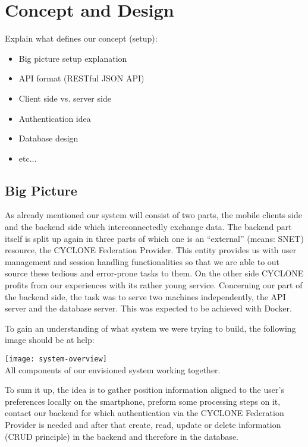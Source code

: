 \chapter{Concept and Design}
\label{cha:conceptanddesign}

Explain what defines our concept (setup):
\begin{itemize}
    \item Big picture setup explanation
    \item API format (RESTful JSON API)
    \item Client side vs. server side
    \item Authentication idea
    \item Database design
    \item etc...
\end{itemize}


\vspace{0.5cm}

\section{Big Picture}

As already mentioned our system will consist of two parts, the mobile clients side and the backend side which interconnectedly exchange data. The backend part itself is split up again in three parts of which one is an \enquote{external} (means: SNET) resource, the CYCLONE Federation Provider. This entity provides us with user management and session handling functionalities so that we are able to out source these tedious and error-prone tasks to them. On the other side CYCLONE profits from our experiences with its rather young service. Concerning our part of the backend side, the task was to serve two machines independently, the API server and the database server. This was expected to be achieved with Docker.

To gain an understanding of what system we were trying to build, the following image should be at help:

\begin{center}
    \texttt{[image: system-overview]}\\
    All components of our envisioned system working together.
\end{center}

To sum it up, the idea is to gather position information aligned to the user's preferences locally on the smartphone, preform some processing steps on it, contact our backend for which authentication via the CYCLONE Federation Provider is needed and after that create, read, update or delete information (CRUD principle) in the backend and therefore in the database.


